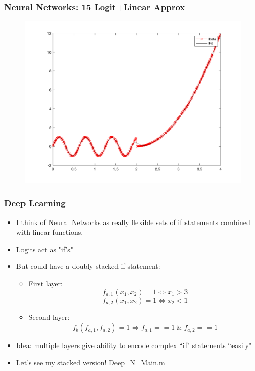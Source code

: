 \documentclass{beamer}
\begin{document}
\begin{frame}
\frametitle[alignment=center]{Neural Networks: 15 Logit+Linear Approx}
\begin{figure}
\includegraphics[scale=0.5]{NN_Example/Fig_Shallow_15.png}
\end{figure}
\end{frame}


\begin{frame}
\frametitle[alignment=center]{Deep Learning}
\begin{itemize}
\item I think of Neural Networks as really flexible sets of if statements combined with linear functions.
\bigskip
\item Logits act as "if's"
\bigskip
\item But could have a doubly-stacked if statement: 
\begin{itemize}
\item First layer: $$f_{a,1}(x_1,x_2)=1\iff x_1>3$$ $$f_{a,2}(x_1,x_2)=1\iff x_2<1$$
\item Second layer: $$f_b(f_{a,1},f_{a,2})=1\iff f_{a,1}==1\ \&\ f_{a,2}==1$$
\end{itemize}
\item Idea:  multiple layers give ability to encode complex ``if" statements ``easily"
\bigskip
\item Let's see my stacked version!  Deep\_N\_Main.m
\end{itemize}
\end{frame}
\end{document}
